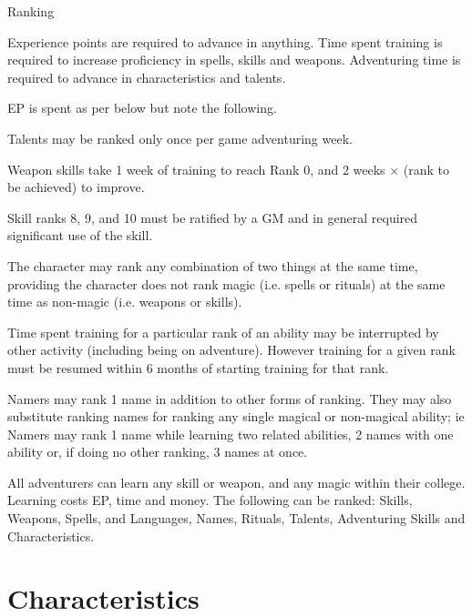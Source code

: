 \begin{Chapter}{Ranking}

Experience points are required to advance in anything.  Time spent
training is required to increase proficiency in spells, skills and
weapons.  Adventuring time is required to advance in characteristics
and talents.

EP is spent as per below but note the following.

\begin{Itemize}
  
\item Talents may be ranked only once per game adventuring week.

\item Weapon skills take 1 week of training to reach Rank 0, and 2
  weeks × (rank to be achieved) to improve.

\item Skill ranks 8, 9, and 10 must be ratified by a GM and in general
  required significant use of the skill.

\item The character may rank any combination of two things at the same
  time, providing the character does not rank magic (i.e.  spells or
  rituals) at the same time as non-magic (i.e. weapons or skills).

\item Time spent training for a particular rank of an ability may be
  interrupted by other activity (including being on adventure).
  However training for a given rank must be resumed within 6 months of
  starting training for that rank.

\item Namers may rank 1 name in addition to other forms of
  ranking. They may also substitute ranking names for ranking any
  single magical or non-magical ability; ie Namers may rank 1 name
  while learning two related abilities, 2 names with one ability or,
  if doing no other ranking, 3 names at once.

\end{Itemize}

All adventurers can learn any skill or weapon, and any magic within
their college. Learning costs EP, time and money.  The following can
be ranked: Skills, Weapons, Spells, and Languages, Names, Rituals,
Talents, Adventuring Skills and Characteristics.

\section{Characteristics}


\end{Chapter}
